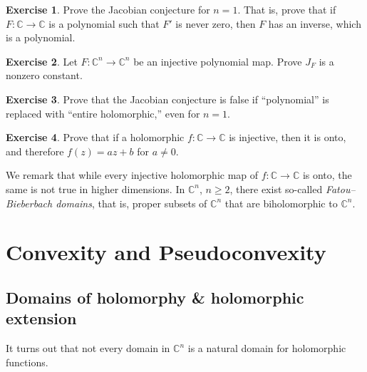 \documentclass[12pt,openany]{book}
\newcommand{\C}{{\mathbb{C}}}
\theoremstyle{plain}
\theoremstyle{remark}
\theoremstyle{definition}
\newenvironment{exbox}{%
    \def\FrameCommand{\vrule width 1pt \relax\hspace{10pt}}%
    \MakeFramed{\advance\hsize-\width\FrameRestore}%
}{%
    \endMakeFramed
}
\theoremstyle{exercise}
\newtheorem{exercise}{Exercise}[section]
\theoremstyle{example}
\begin{document}
\begin{exbox}
\begin{exercise}
Prove the Jacobian conjecture for $n=1$.  That is, prove that if
$F \colon \C \to \C$ is a polynomial such that $F'$ is never zero,
then $F$ has an inverse, which is a polynomial.
\end{exercise}

\begin{exercise}
Let $F \colon \C^n \to \C^n$ be an injective polynomial map.
Prove $J_F$ is a nonzero constant.
\end{exercise}

\begin{exercise}
Prove that the Jacobian conjecture is false if
``polynomial'' is replaced with ``entire holomorphic,'' even for $n=1$.
\end{exercise}

\begin{exercise}
Prove that if a holomorphic $f \colon \C \to \C$ is injective, then it is
onto, and therefore $f(z) = az + b$ for $a \not= 0$.
\end{exercise}
\end{exbox}

We remark that while every injective holomorphic
map of $f \colon \C \to \C$ is onto, the same is not true in higher
dimensions.
In $\C^n$, $n \geq 2$, there exist so-called
\emph{Fatou--Bieberbach domains},
that is, proper subsets of $\C^n$ that are biholomorphic to $\C^n$.



\chapter{Convexity and Pseudoconvexity} \label{ch:convexity}


\section{Domains of holomorphy \& holomorphic extension}

It turns out that not every domain in $\C^n$ is a natural domain for
holomorphic functions.
\end{document}
